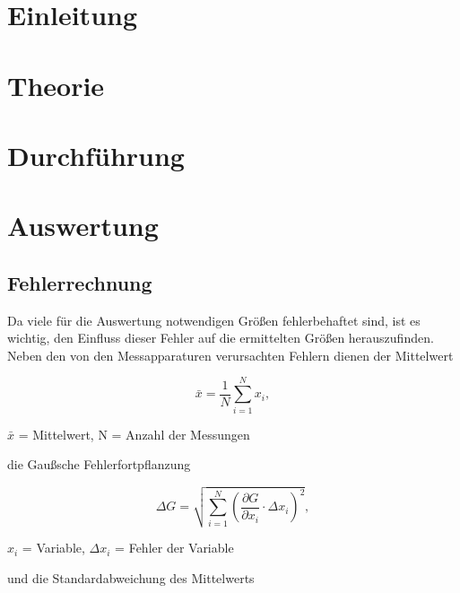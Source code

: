 \newpage					%



\section{Einleitung}				%

\section{Theorie}

\section{Durchführung}

\section{Auswertung}
\subsection{Fehlerrechnung}
Da viele für die Auswertung notwendigen Größen fehlerbehaftet sind, ist es wichtig, den Einfluss dieser Fehler auf die ermittelten
Größen herauszufinden. Neben den von den Messapparaturen verursachten Fehlern dienen der Mittelwert

\begin{formel}
\begin{equation}
 \bar{x} = \frac1N \sum_{i=1}^{N} x_i,
\end{equation}
\caption*{\small{$\bar{x}$ = Mittelwert, N = Anzahl der Messungen}}
\end{formel}

die Gaußsche Fehlerfortpflanzung

\begin{formel}
\begin{equation}
\Delta G = \sqrt{\sum_{i=1}^{N}\left( \frac{\partial G}{\partial x_i}\cdot \Delta x_i\right)^2},
\label{gauss}
\end{equation}
\caption*{$x_i$ = Variable, $\Delta x_i$ = Fehler der Variable}
\end{formel}

und die Standardabweichung des Mittelwerts

